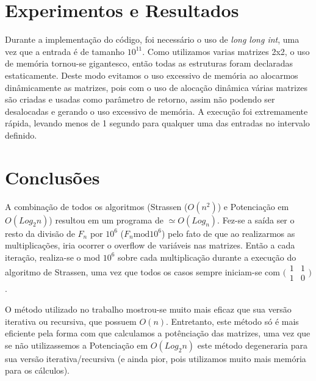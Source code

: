 \documentclass[10pt,a4paper]{article}
\begin{document}
\section{Experimentos e Resultados}
	
Durante a implementação do código, foi necessário o uso de \emph{long long int}, uma vez que a entrada é de tamanho $10^{11}$. Como utilizamos varias matrizes 2x2, o uso de memória tornou-se gigantesco, então todas as estruturas foram declaradas estaticamente. Deste modo evitamos o uso excessivo de memória ao alocarmos dinâmicamente as matrizes, pois com o uso de alocação dinâmica várias matrizes são criadas e usadas como parâmetro de retorno, assim não podendo ser desalocadas e gerando o uso excessivo de memória.
A execução foi extremamente rápida, levando menos de 1 segundo para qualquer uma das entradas no intervalo definido.

\section{Conclusões}
A combinação de todos os algoritmos (Strassen ($O(n^2)$) e Potenciação em $O(Log_2n)$) resultou em um programa de $\simeq O(Log_n)$. Fez-se a saída ser o resto da divisão de $F_n$ por $10^6$ ($F_n  \mbox{mod} 10^6$) pelo fato de que ao realizarmos as multiplicações, iria ocorrer o overflow de variáveis nas matrizes. Então a cada iteração, realiza-se o mod $10^6$ sobre cada multiplicação durante a execução do algoritmo de Strassen, uma vez que todos os casos sempre iniciam-se com
$\bigl(\begin{smallmatrix}
1&1\\ 1&0
\end{smallmatrix} \bigr)$.

O método utilizado no trabalho mostrou-se muito mais eficaz que sua versão iterativa ou recursiva, que possuem $O(n)$. Entretanto, este método só é mais eficiente pela forma com que calculamos a potênciação das matrizes, uma vez que se não utilizassemos a Potenciação em $O(Log_2n)$ este método degeneraria para sua versão iterativa/recursiva (e ainda pior, pois utilizamos muito mais memória para os cálculos).
\end{document}
